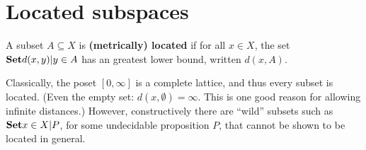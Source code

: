 \documentclass{article}
\def\Rp{[0,\infty]}
\begin{document}
\section{Located subspaces}
\label{sec:located}

\begin{defn}
  A subset $A\subseteq X$ is \textbf{(metrically) located} if for all $x\in X$, the set $\setof{ d(x,y) | y\in A }$ has an greatest lower bound, written $d(x,A)$.
\end{defn}

Classically, the poset $\Rp$ is a complete lattice, and thus every subset is located.
(Even the empty set: $d(x,\emptyset)=\infty$.
This is one good reason for allowing infinite distances.)
However, constructively there are ``wild'' subsets such as $\setof{x\in X | P}$, for some undecidable proposition $P$, that cannot be shown to be located in general.




\end{document}
